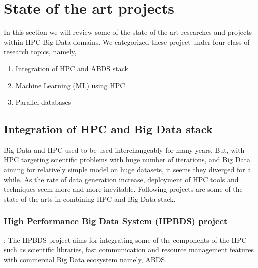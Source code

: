 \documentclass[runningheads,a4paper]{llncs}
\begin{document}
\section{State of the art projects}
In this section we will review some of the state of the art researches and projects within HPC-Big Data domains. We categorized these project under four class of research topics, namely,
\begin{enumerate}
	\item Integration of HPC and ABDS stack
	\item Machine Learning (ML) using HPC
	\item Parallel databases
	
\end{enumerate}
\subsection{Integration of HPC and Big Data stack}
Big Data and HPC used to be used interchangeably for many years. But, with HPC targeting scientific problems with huge number of iterations, and Big Data aiming for relatively simple model on huge datasets, it seems they diverged for a while. As the rate of data generation increase, deployment of HPC tools and techniques seem more and more inevitable. Following projects are some of the state of the arts in combining HPC and Big Data stack.

\subsubsection{High Performance Big Data System (HPBDS) project \cite{qiu2014towards}}: The HPBDS project aims for integrating some of the components of the HPC such as scientific libraries, fast communication and resource management features with commercial Big Data ecosystem namely, ABDS.\\
\end{document}
